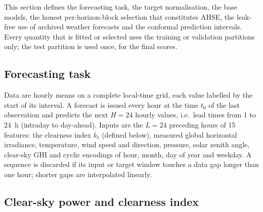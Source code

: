
This section defines the forecasting task, the target normalisation, the base models, the
honest per-horizon-block selection that constitutes AHSE, the leak-free use of archived weather
forecasts and the conformal prediction intervals. Every quantity that is fitted or selected uses
the training or validation partitions only; the test partition is used once, for the final
scores.

\subsection{Forecasting task}
\label{subsec:task}

Data are hourly means on a complete local-time grid, each value labelled by the start of its
interval. A forecast is issued every hour at the time $t_0$ of the last observation and predicts
the next $H = 24$ hourly values, i.e.\ lead times from 1 to 24~h (intraday to day-ahead). Inputs
are the $L = 24$ preceding hours of 15 features: the clearness index $k_t$ (defined below),
measured global horizontal irradiance, temperature, wind speed and direction, pressure, solar
zenith angle, clear-sky GHI and cyclic encodings of hour, month, day of year and weekday. A
sequence is discarded if its input or target window touches a data gap longer than one hour;
shorter gaps are interpolated linearly.

\subsection{Clear-sky power and clearness index}
\label{subsec:pcs}

